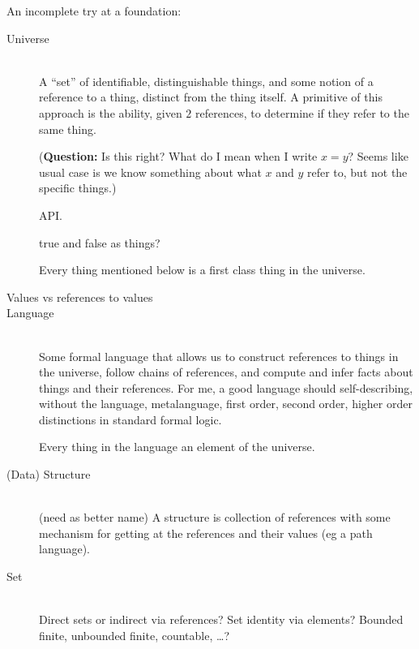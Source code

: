 \documentclass[11pt]{book}
\begin{document}
An incomplete try at a foundation:
\begin{description}

\item[Universe]\mbox{}\\
A ``set'' of identifiable, distinguishable
things,
and some notion of a reference to a thing, distinct from the thing
itself.
A primitive of this approach is the ability, given $2$ references,
to determine if they refer to the same thing.
\par
(\textbf{Question:}
Is this right? What do I mean when I write $x=y$?
Seems like usual case is we know something about what $x$ and $y$
refer to, but not the specific things.)
\par
API. 
\par
\textsf{true} and \textsf{false} as things?
\par
Every thing mentioned below is a first class thing in the universe.

\item[Values vs references to values]%

\item[Language]\mbox{}\\
Some formal language that allows us 
to construct references to things in the universe, 
follow chains of references, and compute and infer facts 
about things and their references. 
For me, a good language should self-describing, without the
language, metalanguage, first order, second order, higher order 
distinctions in standard formal logic.
\par
Every thing in the language an element of the universe.

\item[(Data) Structure]\mbox{}\\
(need as better name)
A structure is collection of references with
some mechanism for getting at the references and their values
(eg a path language).

\item[Set]  \mbox{}\\
Direct sets or indirect via references?
Set identity via elements?
Bounded finite, unbounded finite, countable, \ldots ?


\end{description}
\end{document}
